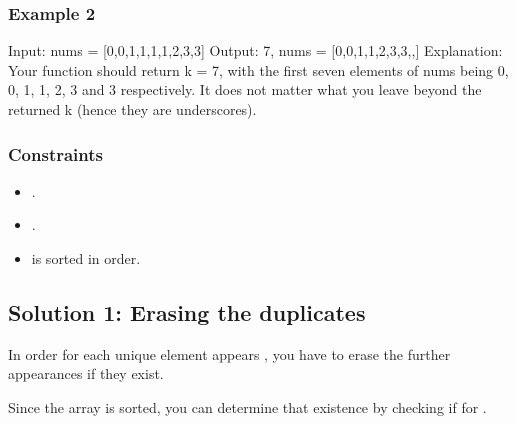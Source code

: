 \documentclass[letterpaper,12pt,english]{book}
\begin{document}
\subsubsection{Example 2}
\label{\detokenize{Sorting/04_SORT_80_Remove_Duplicates_from_Sorted_Array:example-2}}
\begin{sphinxVerbatim}[commandchars=\\\{\}]
Input: nums = [0,0,1,1,1,1,2,3,3]
Output: 7, nums = [0,0,1,1,2,3,3,\PYGZus{},\PYGZus{}]
Explanation: Your function should return k = 7, with the first seven elements of nums being 0, 0, 1, 1, 2, 3 and 3 respectively.
It does not matter what you leave beyond the returned k (hence they are underscores).
\end{sphinxVerbatim}


\subsubsection{Constraints}
\label{\detokenize{Sorting/04_SORT_80_Remove_Duplicates_from_Sorted_Array:constraints}}\begin{itemize}
\item {} 
\sphinxAtStartPar
{}.

\item {} 
\sphinxAtStartPar
{}.

\item {} 
\sphinxAtStartPar
{} is sorted in  order.

\end{itemize}


\subsection{Solution 1: Erasing the duplicates}
\label{\detokenize{Sorting/04_SORT_80_Remove_Duplicates_from_Sorted_Array:solution-1-erasing-the-duplicates}}
\sphinxAtStartPar
In order for each unique element appears , you have to erase the further appearances if they exist.

\sphinxAtStartPar
Since the array  is sorted, you can determine that existence by checking if  for .
\end{document}
